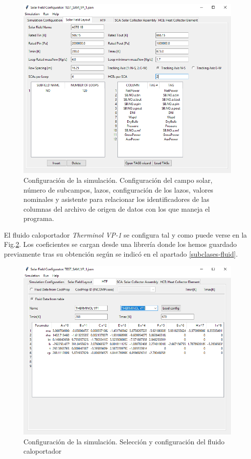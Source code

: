 \begin{figure}[H]
\includegraphics[width=0.9\linewidth]{images/interface02.png}
\caption[Configuración de la simulación del campo solar]{Configuración de la simulación. Configuración del campo solar, número de subcampos, lazos, configuración de los lazos, valores nominales y asistente para relacionar los identificadores de las columnas del archivo de origen de datos con los que maneja el programa.} 
\label{fig:interface02}
\end{figure}

El fluido caloportador \emph{Therminol VP-1} se configura tal y como puede verse en la Fig.\ref{fig:interface03}. Los coeficientes se cargan desde una librería donde los hemos guardado previamente tras su obtención según se indicó en el apartado \ref{subclases-fluid}.

\begin{figure}[H]
\includegraphics[width=0.9\linewidth]{images/interface03.png}
\caption{Configuración de la simulación. Selección y configuración del fluido caloportador} 
\label{fig:interface03}
\end{figure}

